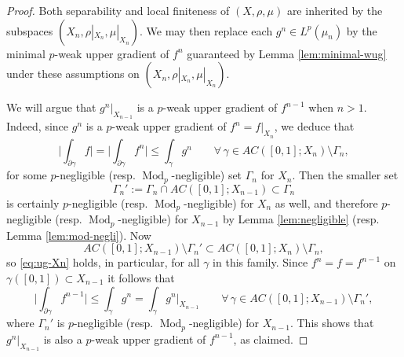 \documentclass[11pt]{amsart}
\theoremstyle{definition}
\theoremstyle{remark}
\numberwithin{equation}{section}
\newcommand{\Babs}[1]{\Big|#1\Big|}
\begin{document}
\begin{proof}
Both separability and local finiteness of $(X,\rho,\mu)$ are inherited by the subspaces
$(X_n,\rho|_{X_n},\mu|_{X_n})$. We may then replace each $g^n\in L^p(\mu_n)$ by the
minimal $p$-weak upper gradient of $f^n$ guaranteed by Lemma \ref{lem:minimal-wug} under
these assumptions on $(X_n,\rho|_{X_n},\mu|_{X_n})$.

We will argue that $g^{n}|_{X_{n-1}}$ is a $p$-weak upper gradient of $f^{n-1}$ when $n>1$.
Indeed, since $g^{n}$ is a $p$-weak upper gradient of $f^{n}=f|_{X_n}$, we deduce that
\begin{equation}\label{eq:ug-Xn}
  \Babs{\int_{\partial\gamma}f}=\Babs{\int_{\partial\gamma}f^{n}}
  \leq\int_{\gamma}g^{n}\qquad\forall\,\gamma\in AC([0,1];X_{n})\setminus\Gamma_{n},
\end{equation}
for some $p$-negligible (resp.  $\operatorname{Mod}_p$-negligible) set $\Gamma_{n}$ for
$X_{n}$. Then the smaller set
\begin{equation*}
  \Gamma_{n}':=\Gamma_{n}\cap AC([0,1];X_{n-1})\subset\Gamma_{n}
\end{equation*}
is certainly $p$-negligible (resp. $\operatorname{Mod}_p$-negligible) for $X_{n}$ as well,
and therefore $p$-negligible (resp. $\operatorname{Mod}_p$-negligible) for $X_{n-1}$ by
Lemma \ref{lem:negligible} (resp. Lemma \ref{lem:mod-negli}). Now
\begin{equation*}
  AC([0,1];X_{n-1})\setminus\Gamma_{n}'
  \subset AC([0,1];X_{n})\setminus\Gamma_{n},
\end{equation*}
so \eqref{eq:ug-Xn} holds, in particular, for all $\gamma$ in this family. Since
$f^{n}=f=f^{n-1}$ on $\gamma([0,1])\subset X_{n-1}$ it follows that
\begin{equation*}
  \Babs{\int_{\partial\gamma}f^{n-1}}
  \leq\int_{\gamma}g^{n}
  =\int_{\gamma}g^{n}|_{X_{n-1}}\qquad\forall\,\gamma\in AC([0,1];X_
  {n-1})\setminus\Gamma_{n}',
\end{equation*}
where $\Gamma_{n}'$ is $p$-negligible (resp. $\operatorname{Mod}_p$-negligible) for
$X_{n-1}$. This shows that $g^{n}|_{X_{n-1}}$ is also a $p$-weak upper gradient of
$f^{n-1}$, as claimed.


\end{proof}
\end{document}
